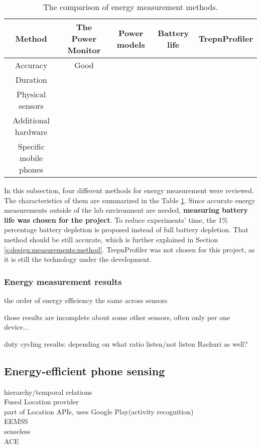 \begin{table}[H]
	\centering
    \begin{tabular}{| c | c | c | c | c | }
    \hline
    Method & The Power Monitor & Power models & Battery life & TrepnProfiler \\ \hline
    Accuracy & Good & & & \\ \hline
    Duration & & & & \\\hline
    Physical sensors & & & &\\ \hline
    Additional hardware & & & &\\ \hline
    Specific mobile phones & & & &\\ \hline
    \end{tabular}
    \caption{The comparison of energy measurement methods. }
	\label{table:energymeasurementmethods}
\end{table}
	
In this subsection, four different methods for energy measurement were reviewed. The characteristics of them are summarized in the Table \ref{table:energymeasurementmethods}. Since accurate energy measurements outside of the lab environment are needed, \textbf{measuring battery life was chosen for the project}.  To reduce experiments' time, the 1\% percentage battery depletion is proposed instead of full battery depletion. That method should be still accurate, which is further explained in Section \ref{s:design:measurements:method}. TrepnProfiler was not chosen for this project, as it is still the technology under the development.

\subsubsection{Energy measurement results}
the order of energy efficiency the same across sensors

\cite{benabdesslem:senseless} \cite{constandache:localization} \cite{wang:eemss}

those results are incomplete about some other sensors, often only per one device...

duty cycling results: depending on what ratio listen/not listen
 \cite{chon:smartdc}
 Rachuri as well?
	
\subsection{Energy-efficient phone sensing}
hierarchy/temporal relations\\
	Fused Location provider\cite{android:locationapi}\\
		part of Location APIs, uses Google Play(activity recognition)\\
	EEMSS \cite{wang:eemss}\\
	senseless \cite{benabdesslem:senseless}\\
	ACE \cite{nath:ace}\\

